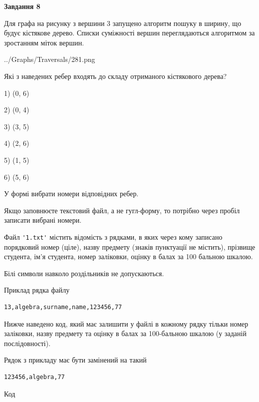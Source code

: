 \documentclass[12pt, ukrainian]{article}
\def\code#1{\Verb!#1!}
\begin{document}
{\begin {large}
{\begin {center}\textbf{Завдання 8}\end {center}}\par
Для графа на рисунку з вершини 3 запущено алгоритм пошуку в ширину, що будує кістякове дерево. Списки суміжності вершин переглядаються алгоритмом за зростанням міток вершин.\par
\begin{center}
	{../Graphs/Traversals/281.png}
\end{center}
\par Які з наведених ребер входять до складу отриманого кістякового дерева?\par
1) (0, 6)\par
2) (0, 4)\par
3) (3, 5)\par
4) (2, 6)\par
5) (1, 5)\par
6) (5, 6)\par
{\vskip 15pt} У формі вибрати номери відповідних ребер.


Якщо заповнюєте текстовий файл, а не гугл-форму, то потрібно через пробіл записа\-ти вибрані номери.\par
\newpage


Файл \code{'1.txt'} містить відомість з рядками, в яких через кому записа\-но поряд\-ковий номер (ціле), назву предмету (знаків пунктуації не містить), прізвище студента, ім'я студента, номер заліковки, оцінку в балах за 100 бальною шкалою.

Білі символи навколо роздільників не допускаються.

Приклад рядка файлу



\begin{verbatim}
13,algebra,surname,name,123456,77
\end{verbatim}


Нижче наведено код, який має залишити у файлі в кожному рядку тільки номер заліковки, назву предмету та оцінку в балах за 100-бальною шкалою (у заданій послі\-дов\-ності).

Рядок з прикладу має бути замінений на такий



\begin{verbatim}
123456,algebra,77
\end{verbatim}




Код




\end{large}}
\end{document}
